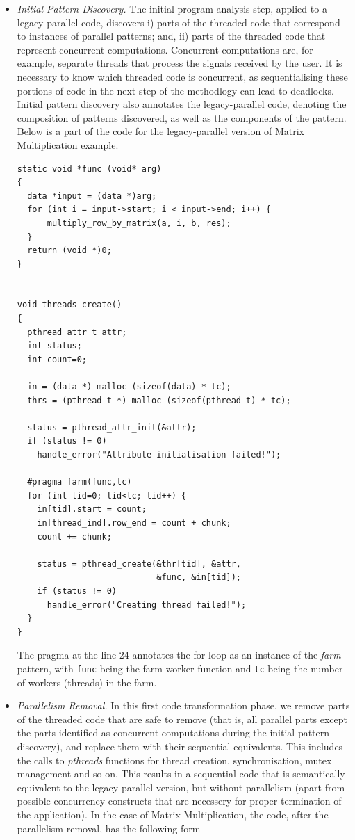 \begin{itemize}
\item \emph{Initial Pattern Discovery.} The initial program analysis step, applied to a legacy-parallel code, discovers i) parts of the threaded code that correspond to instances of parallel patterns; and, ii) parts of the threaded code that represent concurrent computations. Concurrent computations are, for example, separate threads that process the signals received by the user. It is necessary to know which threaded code is concurrent, as sequentialising these portions of code in the next step of the methodlogy can lead to deadlocks. Initial pattern discovery also annotates the legacy-parallel code, denoting the composition of patterns discovered, as well as the components of the pattern. Below is a part of the code for the legacy-parallel version of Matrix Multiplication example.

\begin{lstlisting}
static void *func (void* arg)
{
  data *input = (data *)arg;
  for (int i = input->start; i < input->end; i++) {
	  multiply_row_by_matrix(a, i, b, res);
  }
  return (void *)0;
}


void threads_create()
{
  pthread_attr_t attr;
  int status;
  int count=0;
  
  in = (data *) malloc (sizeof(data) * tc);
  thrs = (pthread_t *) malloc (sizeof(pthread_t) * tc);
  
  status = pthread_attr_init(&attr);
  if (status != 0)
    handle_error("Attribute initialisation failed!");

  #pragma farm(func,tc)   
  for (int tid=0; tid<tc; tid++) {  
    in[tid].start = count;
    in[thread_ind].row_end = count + chunk;
    count += chunk;

    status = pthread_create(&thr[tid], &attr,
                            &func, &in[tid]);
    if (status != 0)
      handle_error("Creating thread failed!");
  }
}

\end{lstlisting}

The pragma at the line 24 annotates the for loop as an instance of the \emph{farm} pattern, with \lstinline{func} being the farm worker function and \lstinline{tc} being the number of workers (threads) in the farm.

\item \emph{Parallelism Removal.} In this first code transformation phase, we remove parts of the threaded code that are safe to remove (that is, all parallel parts except the parts identified as concurrent computations during the initial pattern discovery), and replace them with their sequential equivalents. This includes the calls to \emph{pthreads} functions for thread creation, synchronisation, mutex management and so on. This results in a sequential code that is semantically equivalent to the legacy-parallel version, but without parallelism (apart from possible concurrency constructs that are necessery for proper termination of the application). In the case of Matrix Multiplication, the code, after the parallelism removal, has the following form


\end{itemize}
